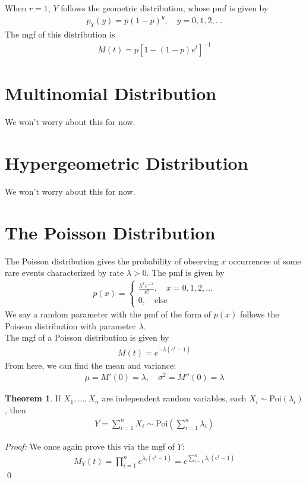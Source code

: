 \documentclass{book}
\theoremstyle{definition}
\newtheorem{thm}{Theorem}[section]
\newcommand{\f}[2]{\frac{#1}{#2}}
\newcommand{\lp}{\left(}
\newcommand{\rp}{\right)}
\begin{document}
 
When $r=1$, $Y$ follows the geometric distribution, whose pmf is given by
\begin{align}
\boxed{p_Y(y) = p(1-p)^y,\quad y = 0,1,2,\dots}
\end{align}
The mgf of this distribution is 
\begin{align}
\boxed{M(t) = p[1-(1-p)e^{t}]^{-1}}
\end{align}




\section{Multinomial Distribution}
We won't worry about this for now.
\section{Hypergeometric Distribution}
We won't worry about this for now.



\section{The Poisson Distribution}

The Poisson distribution gives the probability of observing $x$ occurrences of some rare events characterized by rate $\lambda > 0$. The pmf is given by
\begin{align}
\boxed{p(x) = \begin{cases}
	\f{\lambda^x e^{-\lambda}}{x!}, \quad x = 0,1,2,\dots\\
	0, \quad \text{else}
	\end{cases}}
\end{align}
We say a random parameter with the pmf of the form of $p(x)$ follows the Poisson distribution with parameter $\lambda$.  \\

The mgf of a Poisson distribution is given by 
\begin{align}
\boxed{M(t)= e^{-\lambda (e^t-1)}}
\end{align}
From here, we can find the mean and variance:
\begin{align}
\boxed{\mu = M'(0) = \lambda, \quad \sigma^2 = M''(0) = \lambda}
\end{align}


\begin{thm} If $X_1, \dots, X_n$ are independent random variables, each $X_i \sim \text{Poi}(\lambda_i)$, then 
\begin{align}
\boxed{Y = \sum^n_{i=1} X_i \sim \text{Poi}\lp \sum^n_{i=1}\lambda_i \rp}
\end{align}
\end{thm}
\noindent \textit{Proof:} We once again prove this via the mgf of $Y$:
\begin{align}
M_Y(t) = \prod^n_{i=1}e^{\lambda_i (e^t-1)} = e^{\sum^n_{i=1} \lambda_i(e^t - 1)}
\end{align}
\qed
\end{document}
